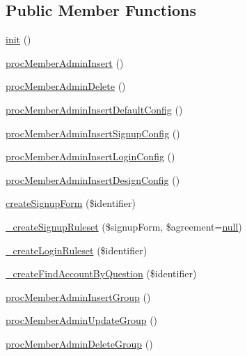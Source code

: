 \subsection*{Public Member Functions}
\begin{DoxyCompactItemize}
\item 
\hyperlink{classmemberAdminController_a6c8b7afa8a1e9de99069b819d30d4f4f}{init} ()
\item 
\hyperlink{classmemberAdminController_a1e89340738ee22bd5af9de8521076aa0}{proc\+Member\+Admin\+Insert} ()
\item 
\hyperlink{classmemberAdminController_abbab5de7009e650ce1ca96d335e9b7be}{proc\+Member\+Admin\+Delete} ()
\item 
\hyperlink{classmemberAdminController_aed6b9a31f228437805b53841455ebeed}{proc\+Member\+Admin\+Insert\+Default\+Config} ()
\item 
\hyperlink{classmemberAdminController_a9e134d115f4fa383b20ec2b7c8cae444}{proc\+Member\+Admin\+Insert\+Signup\+Config} ()
\item 
\hyperlink{classmemberAdminController_a8145cf05118cd5728eb93066efce3fa8}{proc\+Member\+Admin\+Insert\+Login\+Config} ()
\item 
\hyperlink{classmemberAdminController_a95ca46d0090220adba228592e8e09aa5}{proc\+Member\+Admin\+Insert\+Design\+Config} ()
\item 
\hyperlink{classmemberAdminController_a5169e7a00b203b65f8be3efb491937a1}{create\+Signup\+Form} (\$identifier)
\item 
\hyperlink{classmemberAdminController_ae032ea2bb44c28bfa7e04a4d5e357040}{\+\_\+create\+Signup\+Ruleset} (\$signup\+Form, \$agreement=\hyperlink{modernizr_8min_8js_a286f9ec831c5e676eeb493248eab9575}{null})
\item 
\hyperlink{classmemberAdminController_ad9823f9a79e8a26a39d912bcd888e301}{\+\_\+create\+Login\+Ruleset} (\$identifier)
\item 
\hyperlink{classmemberAdminController_a6e227f85ce71ac94e57e37ecc395613f}{\+\_\+create\+Find\+Account\+By\+Question} (\$identifier)
\item 
\hyperlink{classmemberAdminController_a3ae8c66d424cd909998fbcd9f257c809}{proc\+Member\+Admin\+Insert\+Group} ()
\item 
\hyperlink{classmemberAdminController_a8d14fe0f7df63dbce5cc50d61d452635}{proc\+Member\+Admin\+Update\+Group} ()
\item 
\hyperlink{classmemberAdminController_a8ee81f4eedf5dc094b5a21a9a1200849}{proc\+Member\+Admin\+Delete\+Group} ()
\item 

\end{DoxyCompactItemize}
